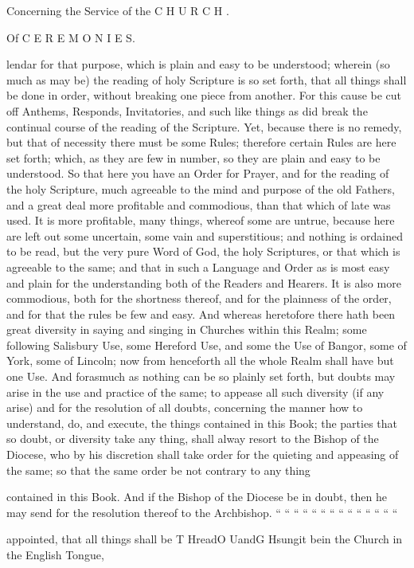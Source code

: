 Concerning the Service of the C H U R C H .

Of C E R E M O N I E S.

lendar for that purpose, which is plain and easy to be understood; wherein (so much as may be) the reading of holy Scripture is so set forth, that all things shall be done in order, without breaking one piece from another. For this cause be cut off Anthems, Responds, Invitatories, and such like things as did break the continual course of the reading of the Scripture. Yet, because there is no remedy, but that of necessity there must be some Rules; therefore certain Rules are here set forth; which, as they are few in number, so they are plain and easy to be understood. So that here you have an Order for Prayer, and for the reading of the holy Scripture, much agreeable to the mind and purpose of the old Fathers, and a great deal more profitable and commodious, than that which of late was used. It is more profitable, many things, whereof some are untrue, because here are left out some uncertain, some vain and superstitious; and nothing is ordained to be read, but the very pure Word of God, the holy Scriptures, or that which is agreeable to the same; and that in such a Language and Order as is most easy and plain for the understanding both of the Readers and Hearers. It is also more commodious, both for the shortness thereof, and for the plainness of the order, and for that the rules be few and easy. And whereas heretofore there hath been great diversity in saying and singing in Churches within this Realm; some following Salisbury Use, some Hereford Use, and some the Use of Bangor, some of York, some of Lincoln; now from henceforth all the whole Realm shall have but one Use. And forasmuch as nothing can be so plainly set forth, but doubts may arise in the use and practice of the same; to appease all such diversity (if any arise) and for the resolution of all doubts, concerning the manner how to understand, do, and execute, the things contained in this Book; the parties that so doubt, or diversity take any thing, shall alway resort to the Bishop of the Diocese, who by his discretion shall take order for the quieting and appeasing of the same; so that the same order be not contrary to any thing

contained in this Book. And if the Bishop of the Diocese be in doubt, then he may send for the resolution thereof to the Archbishop. “ “ “ “ “ “ “ “ “ “ “ “ “ “

appointed, that all things shall be T HreadO UandG Hsungit bein the Church in the English Tongue,

